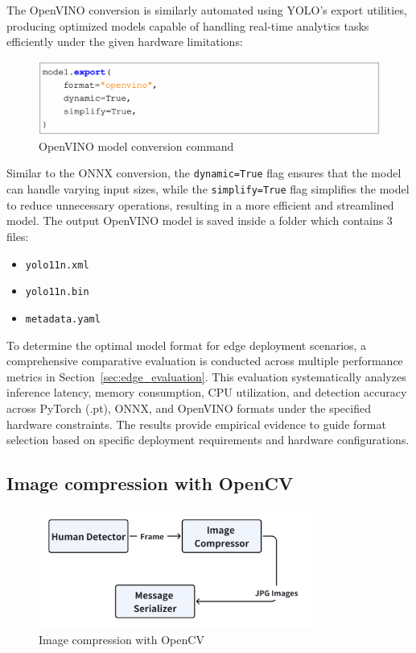 The OpenVINO conversion is similarly automated using YOLO's export utilities, producing optimized models capable of handling real-time analytics tasks efficiently under the given hardware limitations:

\begin{figure}[htbp]
    \centering
    \includegraphics[width=1\textwidth]{Figure/openvino_command.png}
    \caption{OpenVINO model conversion command}
    \label{fig:openvino_command}
\end{figure}

Similar to the ONNX conversion, the \texttt{dynamic=True} flag ensures that the model can handle varying input sizes, while the \texttt{simplify=True} flag simplifies the model to reduce unnecessary operations, resulting in a more efficient and streamlined model. The output OpenVINO model is saved inside a folder which contains 3 files:
\begin{itemize}
    \item \texttt{yolo11n.xml}
    \item \texttt{yolo11n.bin}
    \item \texttt{metadata.yaml}
\end{itemize}


To determine the optimal model format for edge deployment scenarios, a comprehensive comparative evaluation is conducted across multiple performance metrics in Section~\ref{sec:edge_evaluation}. This evaluation systematically analyzes inference latency, memory consumption, CPU utilization, and detection accuracy across PyTorch (.pt), ONNX, and OpenVINO formats under the specified hardware constraints. The results provide empirical evidence to guide format selection based on specific deployment requirements and hardware configurations.


\subsection{Image compression with OpenCV}
\label{sec:edge_image_compression}

\begin{figure}[htbp]
    \centering
    \includegraphics[width=0.8\textwidth]{Figure/edge_compress.png}
    \caption{Image compression with OpenCV}
    \label{fig:edge_compress}
\end{figure}

